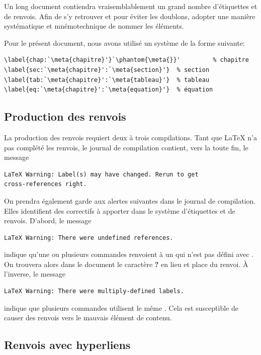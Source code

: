 \begin{conseil}
  Un long document contiendra vraisemblablement un grand nombre
  d'étiquettes et de renvois. Afin de s'y retrouver et pour éviter les
  doublons, adopter une manière systématique et mnémotechnique de
  nommer les éléments.

  Pour le présent document, nous avons utilisé un système de la forme
  suivante:
\begin{lstlisting}
\label{chap:`\meta{chapitre}'}`\phantom{\meta{}}'         % chapitre
\label{sec:`\meta{chapitre}':`\meta{section}'}  % section
\label{tab:`\meta{chapitre}':`\meta{tableau}'}  % tableau
\label{eq:`\meta{chapitre}':`\meta{equation}'}  % équation
\end{lstlisting}
\end{conseil}

\subsection{Production des renvois}
\label{sec:organisation:renvois:production}

La production des renvois requiert deux à trois compilations.
Tant que {\LaTeX} n'a pas complété les renvois, le journal de
compilation contient, vers la toute fin, le message
\begin{verbatim}
LaTeX Warning: Label(s) may have changed. Rerun to get
cross-references right.
\end{verbatim}

On prendra également garde aux alertes suivantes dans le journal de
compilation. Elles identifient des correctifs à apporter dans le
système d'étiquettes et de renvois. D'abord, le message
\begin{verbatim}
LaTeX Warning: There were undefined references.
\end{verbatim}
indique qu'une ou plusieurs commandes \cmd{\ref} renvoient à un
 qui n'est pas défini avec \cmd{\label}. On trouvera alors
dans le document le caractère \textbf{?} en lieu et place du renvoi. À
l'inverse, le message
\begin{verbatim}
LaTeX Warning: There were multiply-defined labels.
\end{verbatim}
indique que plusieurs commandes \cmdprint{\label} utilisent le même
. Cela est susceptible de causer des renvois vers le mauvais
élément de contenu.

\subsection{Renvois avec hyperliens}
\label{sec:organisation:renvois:hyperliens}

